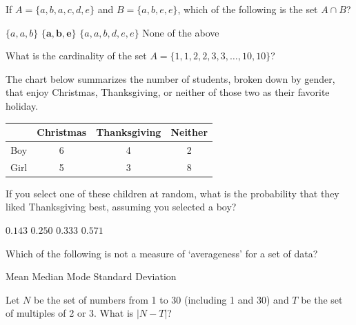 \documentclass[12pt,letterpaper,answers]{exam}
\begin{document}
\begin{questions}
\question If $A= \{ a, b, a, c, d, e \}$ and $B= \{ a, b, e, e \}$, which of the following is the set $A \cap B$?
	\begin{choices}
	\choice $\{ a, a, b \}$
	\CorrectChoice $\mathbf{\{ a, b, e \}}$
	\choice $\{ a, a, b, d, e, e \}$
	\choice None of the above
	\end{choices}

\vfill

\question What is the cardinality of the set $A= \{ 1, 1, 2, 2, 3, 3, \ldots, 10, 10 \}$?
	\begin{choices}
	\choice 4
	\choice 8
	\CorrectChoice 10
	\choice 20
	\end{choices}

\vfill

\question The chart below summarizes the number of students, broken down by gender, that enjoy Christmas, Thanksgiving, or neither of those two as their favorite holiday. \par
	\begin{table}[H]
	\centering
	\begin{tabular}{|c|c|c|c|} \hline
	& Christmas & Thanksgiving & Neither \\ \hline
	Boy & 6 & 4 & 2 \\ \hline
	Girl & 5 & 3 & 8 \\ \hline
	\end{tabular}
	\end{table} \par
If you select one of these children at random, what is the probability that they liked Thanksgiving best, assuming you selected a boy?
	\begin{choices}
	\choice $0.143$
	\choice $0.250$
	\CorrectChoice $\mathbf{0.333}$
	\choice $0.571$
	\end{choices}

\vfill

\question Which of the following is not a measure of `averageness' for a set of data?
	\begin{choices}
	\choice Mean
	\choice Median
	\choice Mode
	\CorrectChoice Standard Deviation
	\end{choices}

\vfill

\question Let $N$ be the set of numbers from 1 to 30 (including 1 and 30) and $T$ be the set of multiples of 2 or 3. What is $|N - T|$?
	\begin{choices}
	\choice 15
	\choice 25
	\end{choices}


\end{questions}
\end{document}
